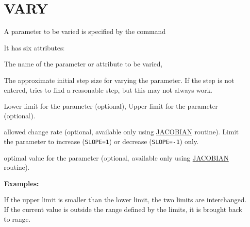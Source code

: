  





%
 
\section{VARY}
\label{sec:vary}
A parameter to be varied is specified by the command 


It has six attributes: 
\begin{madlist}
   The name of the parameter or attribute to be varied,  

   The approximate initial step size for varying the
  parameter. If the step is not entered, \madx tries to find a
  reasonable step, but this may not always work.  

   Lower limit for the parameter (optional), 
   Upper limit for the parameter (optional). 

   allowed change rate (optional, available only using
  \hyperref[sec:jacobian]{JACOBIAN} routine). Limit the
  parameter to increase ({\tt SLOPE=1}) or decrease ({\tt SLOPE=-1}) only.

   optimal value for the parameter (optional, available
  only using \hyperref[sec:jacobian]{JACOBIAN} routine).  
\end{madlist}

{\bf Examples:}

If the upper limit is smaller than the lower limit, the two limits are
interchanged. If the current value is outside the range defined by the
limits, it is brought back to range. 

